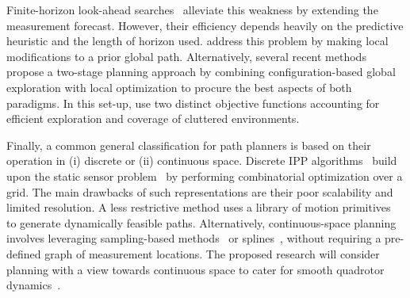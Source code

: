 Finite-horizon look-ahead searches~\cite{Lim2015, Hollinger2009, How2010} alleviate this weakness by 
extending the measurement forecast. However, their efficiency depends heavily on the predictive heuristic and 
the length of horizon used. \citet{Hitz2015} address this problem by making local modifications to a prior 
global path. Alternatively, several recent methods~\cite{Kuntz2016, Charrow2015a, Heng2015} propose a 
two-stage planning approach by combining configuration-based global exploration with local optimization to 
procure the best aspects of both paradigms. In this set-up, \citet{Heng2015} use two distinct objective 
functions accounting for efficient exploration and coverage of cluttered environments.

Finally, a common general classification for path planners is based on their operation in (i) discrete or 
(ii) continuous space. Discrete IPP algorithms~\cite{Chekuri2005, Hollinger2014, Binney2013} build upon the 
static sensor problem~\cite{Krause2008} by performing combinatorial optimization over a grid. The main 
drawbacks of such representations are their poor scalability and limited resolution. A less restrictive 
method uses a library of motion primitives~\cite{Charrow2015a, Heng2015} to generate dynamically feasible 
paths. Alternatively, continuous-space planning involves leveraging sampling-based 
methods~\cite{Hollinger2014, Bircher2016, Jadidi2016} or splines~\cite{Hitz2015, Marchant2014}, without 
requiring a pre-defined graph of measurement locations. The proposed research will consider planning with a 
view towards continuous space to cater for smooth quadrotor dynamics~\cite{Richter2013}.
